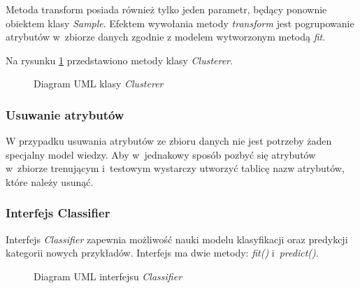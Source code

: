 \documentclass[../thesis.tex]{subfiles}
\begin{document}
Metoda transform posiada również tylko jeden parametr, będący ponownie obiektem klasy \emph{Sample}. Efektem wywołania metody \emph{transform} jest pogrupowanie atrybutów w~zbiorze danych zgodnie z modelem wytworzonym metodą \emph{fit}.

Na rysunku \ref{proj:diagram_clusterer} przedstawiono metody klasy \emph{Clusterer}.

\begin{figure}[h]
\centering
{}
\caption{Diagram UML klasy \emph{Clusterer}}
\label{proj:diagram_clusterer}
\end{figure}

\subsubsection{Usuwanie atrybutów}

W przypadku usuwania atrybutów ze zbioru danych nie jest potrzeby żaden specjalny model wiedzy. Aby w~jednakowy sposób pozbyć się atrybutów w~zbiorze trenującym i~testowym wystarczy utworzyć tablicę nazw atrybutów, które należy usunąć.

\subsubsection{Interfejs Classifier}

Interfejs \emph{Classifier} zapewnia możliwość nauki modelu klasyfikacji oraz predykcji kategorii nowych przykładów. Interfejs ma dwie metody: \emph{fit()} i~\emph{predict()}.

\begin{figure}[h]
\centering
{}
\caption{Diagram UML interfejsu \emph{Classifier}}
\label{proj:diagram_classifier}
\end{figure}
\end{document}
